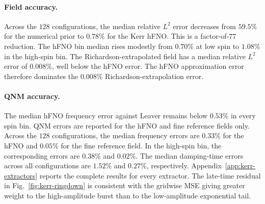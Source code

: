 \paragraph{Field accuracy.} Across the $128$ configurations, the
median relative $L^{2}$ error decreases from $59.5\%$ for the
numerical prior to $0.78\%$ for the Kerr hFNO. This is a factor-of-$77$
reduction. The hFNO bin median rises modestly from $0.70\%$ at low spin
to $1.08\%$ in the high-spin bin. The Richardson-extrapolated field
has a median relative $L^2$ error of $0.008\%$, well below the hFNO
error. The hFNO approximation error therefore dominates the
$0.008\%$ Richardson-extrapolation error.

\paragraph{QNM accuracy.} The median hFNO frequency error against
Leaver remains below $0.53\%$ in every spin bin. QNM errors are
reported for the hFNO and fine reference fields only. Across the
$128$ configurations, the median frequency errors are $0.33\%$ for
the hFNO and $0.05\%$ for the fine reference field. In the high-spin
bin, the corresponding errors are $0.38\%$ and $0.02\%$. The median
damping-time errors across all configurations are $1.52\%$ and
$0.27\%$, respectively. Appendix~\ref{app:kerr-extractors} reports
the complete results for every extractor. The late-time residual in
Fig.~\ref{fig:kerr-ringdown} is consistent with the gridwise MSE
giving greater weight to the high-amplitude burst than to the
low-amplitude exponential tail.

\FloatBarrier
